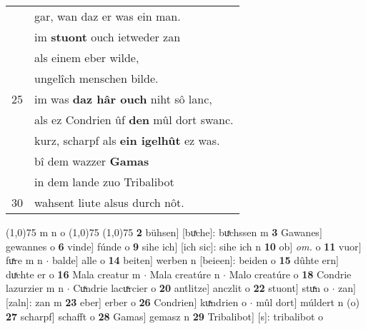 \documentclass[8pt,a4paper,notitlepage]{article}
\begin{document}
\begin{table}[ht]
\begin{minipage}[t]{0.5\linewidth}
\begin{tabular}{rl}
 & gar, wan daz er was ein man.\\ 
 & im \textbf{stuont} ouch ietweder zan\\ 
 & als einem eber wilde,\\ 
 & ungelîch menschen bilde.\\ 
25 & im was \textbf{daz hâr ouch} niht sô lanc,\\ 
 & als ez Condrien ûf \textbf{den} mûl dort swanc.\\ 
 & kurz, scharpf als \textbf{ein igelhût} ez was.\\ 
 & bî dem wazzer \textbf{Gamas}\\ 
 & in dem lande zuo Tribalibot\\ 
30 & wahsent liute alsus durch nôt.\\ 
\end{tabular}
\scriptsize
\line(1,0){75} \newline
m n o \newline
\line(1,0){75} \newline
\newline
\line(1,0){75} \newline
\textbf{2} bühsen] [buͯche]: buͯchssen m \textbf{3} Gawanes] gewannes o \textbf{6} vinde] fúnde o \textbf{9} sihe ich] [ich sic]: sihe ich n \textbf{10} ob] \textit{om.} o \textbf{11} vuor] fuͯre m n  $\cdot$ balde] alle o \textbf{14} beiten] werben n [beieen]: beiden o \textbf{15} dûhte ern] duͯchte er o \textbf{16} Mala creatur m  $\cdot$ Mala creatúre n  $\cdot$ Malo creatúre o \textbf{18} Condrie lazurzier m n  $\cdot$ Cuͯndrie lacuͯrcier o \textbf{20} antlitze] anczlit o \textbf{22} stuont] stuͯn o  $\cdot$ zan] [zaln]: zan m \textbf{23} eber] erber o \textbf{26} Condrien] kuͯndrien o  $\cdot$ mûl dort] múldert n (o) \textbf{27} scharpf] schafft o \textbf{28} Gamas] gemasz n \textbf{29} Tribalibot] [s]: tribalibot o \newline
\end{minipage}
\end{table}
\newpage
\end{document}
